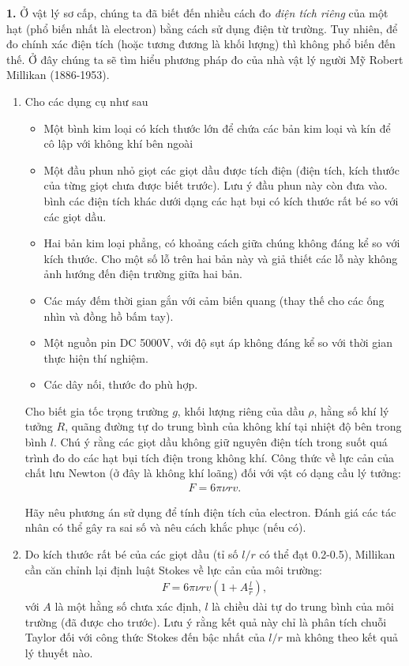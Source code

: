 \textbf{1.} Ở vật lý sơ cấp, chúng ta đã biết đến nhiều cách đo \textit{điện tích riêng} của một hạt (phổ biến nhất là electron) bằng cách sử dụng điện từ trường. Tuy nhiên, để đo chính xác điện tích (hoặc tương đương là khối lượng) thì không phổ biến đến thế. Ở đây chúng ta sẽ tìm hiểu phương pháp đo của nhà vật lý người Mỹ Robert Millikan (1886-1953).

\begin{enumerate}[label=\textbf{\alph*,}]\itemsep0em
\item 
Cho các dụng cụ như sau
\begin{itemize}\itemsep0em
\item Một bình kim loại có kích thước lớn để chứa các bản kim loại và kín để cô lập với không khí bên ngoài
\item Một đầu phun nhỏ giọt các giọt dầu được tích điện (điện tích, kích thước của từng giọt chưa được biết trước). Lưu ý đầu phun này còn đưa vào. bình các điện tích khác dưới dạng các hạt bụi có kích thước rất bé so với các giọt dầu.
\item Hai bản kim loại phẳng, có khoảng cách giữa chúng không đáng kể so với kích thước. Cho một số lỗ trên hai bản này và giả thiết các lỗ này không ảnh hướng đến điện trường giữa hai bản.
\item Các máy đếm thời gian gắn với cảm biến quang (thay thế cho các ống nhìn và đồng hồ bấm tay).
\item Một nguồn pin DC 5000V, với độ sụt áp không đáng kể so với thời gian thực hiện thí nghiệm.
\item Các dây nối, thước đo phù hợp.
\end{itemize}

Cho biết gia tốc trọng trường $g$, khối lượng riêng của dầu $\rho$, hằng số khí lý tưởng $R$, quãng đường tự do trung bình của không khí tại nhiệt độ bên trong bình $l$. Chú ý rằng các giọt dầu không giữ nguyên điện tích trong suốt quá trình đo do các hạt bụi tích điện trong không khí.  Công thức về lực cản của chất lưu Newton (ở đây là không khí loãng) đối với vật có dạng cầu lý tưởng:
\begin{align}
F = 6\pi \nu rv.
\end{align}

Hãy nêu phương án sử dụng để tính điện tích của electron. Đánh giá các tác nhân có thể gây ra sai số và nêu cách khắc phục (nếu có).

\item
Do kích thước rất bé của các giọt dầu (tỉ số $l/r$ có thể đạt 0.2-0.5), Millikan cần căn chỉnh lại định luật Stokes về lực cản của môi trường:
\begin{align}
F = 6\pi \nu rv \left(1 + A\frac{l}{r}\right),
\end{align}
với $A$ là một hằng số chưa xác định, $l$ là chiều dài tự do trung bình của môi trường (đã được cho trước).
Lưu ý rằng kết quả này chỉ là phân tích chuỗi Taylor đối với công thức Stokes đến bậc nhất của $l/r$ mà không theo kết quả lý thuyết nào.


\end{enumerate}
